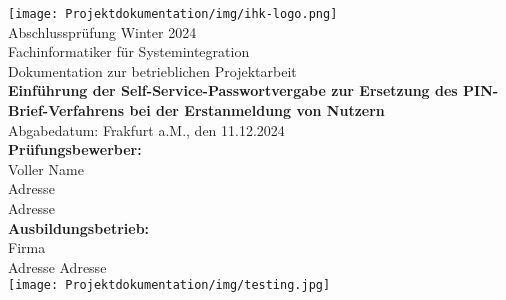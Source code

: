 \documentclass[a4paper,11pt]{report}  %
\begin{document}
\begin{titlepage}
    \centering
    {\texttt{[image: Projektdokumentation/img/ihk-logo.png]}}\\[1em]
    {\large Abschlussprüfung Winter 2024}\\[0.5em]
    {\large Fachinformatiker für Systemintegration}\\[2em]
    {Dokumentation zur betrieblichen Projektarbeit}\\[2.5em]

    {\Large \textbf{Einführung der Self-Service-Passwortvergabe zur Ersetzung des PIN-Brief-Verfahrens bei der Erstanmeldung von Nutzern} }\\ [3em]
    {\normalsize {Abgabedatum: Frakfurt a.M., den 11.12.2024}}\\[2em]
    {\normalsize \textbf{Prüfungsbewerber:}}\\
    {\normalsize {Voller Name }}\\
    Adresse\\
    Adresse \\[2em]
    {\normalsize \textbf{Ausbildungsbetrieb: }}\\
    Firma\\
    Adresse
     Adresse \\[3em]
    {\texttt{[image: Projektdokumentation/img/testing.jpg]}}\\[2em]

\end{titlepage}



\newpage
{} 
\tableofcontents

\newpage
\pagestyle{plain}
\listoffigures

\newpage
\pagestyle{plain}
\listoftables

\newpage
\pagestyle{plain}
\printnoidxglossary[type=\acronymtype,title=Abkürzungsverzeichnis]

\newpage
{}
\setcounter{page}{1}








\newpage
{} 
\setcounter{page}{6}


\setcounter{chapter}{0} %
\renewcommand{\thechapter}{\Alph{chapter}}

\newpage
\pagestyle{plain}
\printbibliography
\end{document}
